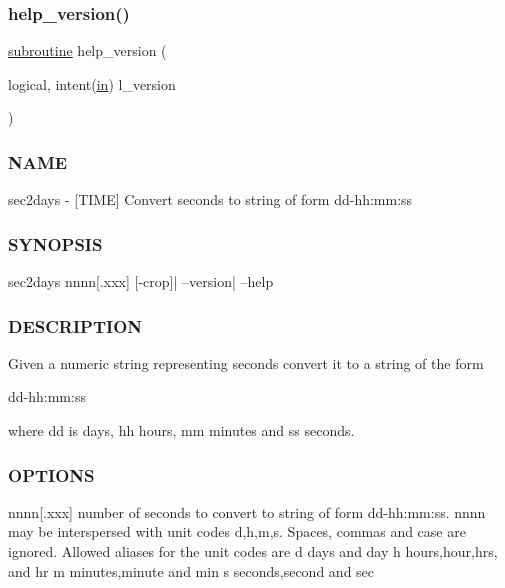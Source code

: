 \subsubsection{\texorpdfstring{help\+\_\+version()}{help\_version()}}
{\footnotesize\ttfamily \hyperlink{M__stopwatch_83_8txt_acfbcff50169d691ff02d4a123ed70482}{subroutine} help\+\_\+version (\begin{DoxyParamCaption}\item[{logical, intent(\hyperlink{M__journal_83_8txt_afce72651d1eed785a2132bee863b2f38}{in})}]{l\+\_\+version }\end{DoxyParamCaption})}



\subsubsection*{N\+A\+ME}

sec2days -\/ \mbox{[}T\+I\+ME\mbox{]} Convert seconds to string of form dd-\/hh\+:mm\+:ss 

\subsubsection*{S\+Y\+N\+O\+P\+S\+IS}

\begin{DoxyVerb}sec2days nnnn[.xxx] [-crop]| --version| --help
\end{DoxyVerb}


\subsubsection*{D\+E\+S\+C\+R\+I\+P\+T\+I\+ON}

Given a numeric string representing seconds convert it to a string of the form

dd-\/hh\+:mm\+:ss

where dd is days, hh hours, mm minutes and ss seconds.

\subsubsection*{O\+P\+T\+I\+O\+NS}

nnnn\mbox{[}.xxx\mbox{]} number of seconds to convert to string of form dd-\/hh\+:mm\+:ss. nnnn may be interspersed with unit codes d,h,m,s. Spaces, commas and case are ignored. Allowed aliases for the unit codes are d days and day h hours,hour,hrs, and hr m minutes,minute and min s seconds,second and sec

